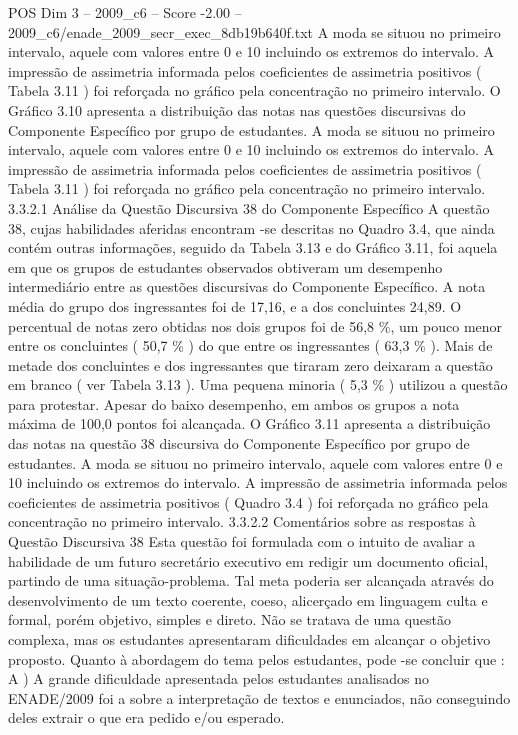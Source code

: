 \begin{textsample}{POS Dim 3 – 2009\_c6 – Score -2.00 – 2009\_c6/enade\_2009\_secr\_exec\_8db19b640f.txt}
A moda se situou no primeiro intervalo, aquele com valores entre 0 e 10 incluindo os extremos do intervalo.
A impressão de assimetria informada pelos coeficientes de assimetria positivos ( Tabela 3.11 ) foi reforçada no gráfico pela concentração no primeiro intervalo.
O Gráfico 3.10 apresenta a distribuição das notas nas questões discursivas do Componente Específico por grupo de estudantes.
A moda se situou no primeiro intervalo, aquele com valores entre 0 e 10 incluindo os extremos do intervalo.
A impressão de assimetria informada pelos coeficientes de assimetria positivos ( Tabela 3.11 ) foi reforçada no gráfico pela concentração no primeiro intervalo. 3.3.2.1 Análise da Questão Discursiva 38 do Componente Específico A questão 38, cujas habilidades aferidas encontram -se descritas no Quadro 3.4, que ainda contém outras informações, seguido da Tabela 3.13 e do Gráfico 3.11, foi aquela em que os grupos de estudantes observados obtiveram um desempenho intermediário entre as questões discursivas do Componente Específico.
A nota média do grupo dos ingressantes foi de 17,16, e a dos concluintes 24,89.
O percentual de notas zero obtidas nos dois grupos foi de 56,8 \%, um pouco menor entre os concluintes ( 50,7 \% ) do que entre os ingressantes ( 63,3 \% ).
Mais de metade dos concluintes e dos ingressantes que tiraram zero deixaram a questão em branco ( ver Tabela 3.13 ).
Uma pequena minoria ( 5,3 \% ) utilizou a questão para protestar.
Apesar do baixo desempenho, em ambos os grupos a nota máxima de 100,0 pontos foi alcançada.
O Gráfico 3.11 apresenta a distribuição das notas na questão 38 discursiva do Componente Específico por grupo de estudantes.
A moda se situou no primeiro intervalo, aquele com valores entre 0 e 10 incluindo os extremos do intervalo.
A impressão de assimetria informada pelos coeficientes de assimetria positivos ( Quadro 3.4 ) foi reforçada no gráfico pela concentração no primeiro intervalo. 3.3.2.2 Comentários sobre as respostas à Questão Discursiva 38 Esta questão foi formulada com o intuito de avaliar a habilidade de um futuro secretário executivo em redigir um documento oficial, partindo de uma situação-problema.
Tal meta poderia ser alcançada através do desenvolvimento de um texto coerente, coeso, alicerçado em linguagem culta e formal, porém objetivo, simples e direto.
Não se tratava de uma questão complexa, mas os estudantes apresentaram dificuldades em alcançar o objetivo proposto.
Quanto à abordagem do tema pelos estudantes, pode -se concluir que : A ) A grande dificuldade apresentada pelos estudantes analisados no ENADE/2009 foi a sobre a interpretação de textos e enunciados, não conseguindo deles extrair o que era pedido e/ou esperado.

\end{textsample}
